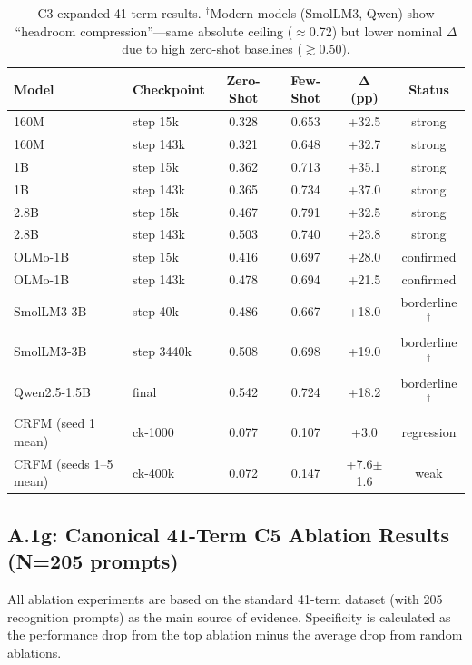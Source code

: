 \documentclass[10pt]{article} %
\begin{document}
\begin{table}[H]
\centering
\small
\begin{tabular}{|l|l|c|c|c|c|}
\hline
\textbf{Model} & \textbf{Checkpoint} & \textbf{Zero-Shot} & \textbf{Few-Shot} & $\mathbf{\Delta}$ \textbf{(pp)} & \textbf{Status} \\
\hline
160M & step 15k & 0.328 & 0.653 & +32.5 & strong \\
160M & step 143k & 0.321 & 0.648 & +32.7 & strong \\
1B & step 15k & 0.362 & 0.713 & +35.1 & strong \\
1B & step 143k & 0.365 & 0.734 & +37.0 & strong \\
2.8B & step 15k & 0.467 & 0.791 & +32.5 & strong \\
2.8B & step 143k & 0.503 & 0.740 & +23.8 & strong \\
OLMo-1B & step 15k & 0.416 & 0.697 & +28.0 & confirmed \\
OLMo-1B & step 143k & 0.478 & 0.694 & +21.5 & confirmed \\
SmolLM3-3B & step 40k & 0.486 & 0.667 & +18.0 & borderline$^\dagger$ \\
SmolLM3-3B & step 3440k & 0.508 & 0.698 & +19.0 & borderline$^\dagger$ \\
Qwen2.5-1.5B & final & 0.542 & 0.724 & +18.2 & borderline$^\dagger$ \\
CRFM (seed 1 mean) & ck-1000 & 0.077 & 0.107 & +3.0 & regression \\
CRFM (seeds 1--5 mean) & ck-400k & 0.072 & 0.147 & +7.6$\pm$1.6 & weak \\
\hline
\end{tabular}
\caption{C3 expanded 41-term results. $^\dagger$Modern models (SmolLM3, Qwen) show ``headroom compression''---same absolute ceiling ($\approx$0.72) but lower nominal $\Delta$ due to high zero-shot baselines ($\gtrsim$0.50).}
\label{tab:a1f3_c3}
\end{table}

\subsection*{A.1g: Canonical 41-Term C5 Ablation Results (N=205 prompts)}

All ablation experiments are based on the standard 41-term dataset (with 205 recognition prompts) as the main source of evidence. Specificity is calculated as the performance drop from the top ablation minus the average drop from random ablations.
\end{document}
